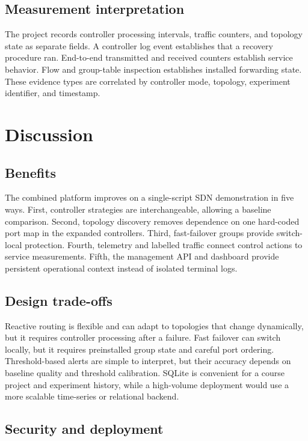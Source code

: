 \documentclass[conference]{IEEEtran}
\begin{document}
\subsection{Measurement interpretation}

The project records controller processing intervals, traffic counters, and
topology state as separate fields. A controller log event establishes that a
recovery procedure ran. End-to-end transmitted and received counters establish
service behavior. Flow and group-table inspection establishes installed
forwarding state. These evidence types are correlated by controller mode,
topology, experiment identifier, and timestamp.

\section{Discussion}
\label{sec:discussion}

\subsection{Benefits}

The combined platform improves on a single-script SDN demonstration in five
ways. First, controller strategies are interchangeable, allowing a baseline
comparison. Second, topology discovery removes dependence on one hard-coded
port map in the expanded controllers. Third, fast-failover groups provide
switch-local protection. Fourth, telemetry and labelled traffic connect
control actions to service measurements. Fifth, the management API and
dashboard provide persistent operational context instead of isolated terminal
logs.

\subsection{Design trade-offs}

Reactive routing is flexible and can adapt to topologies that change
dynamically, but it requires controller processing after a failure. Fast
failover can switch locally, but it requires preinstalled group state and
careful port ordering. Threshold-based alerts are simple to interpret, but
their accuracy depends on baseline quality and threshold calibration.
SQLite is convenient for a course project and experiment history, while a
high-volume deployment would use a more scalable time-series or relational
backend.

\subsection{Security and deployment}
\end{document}
